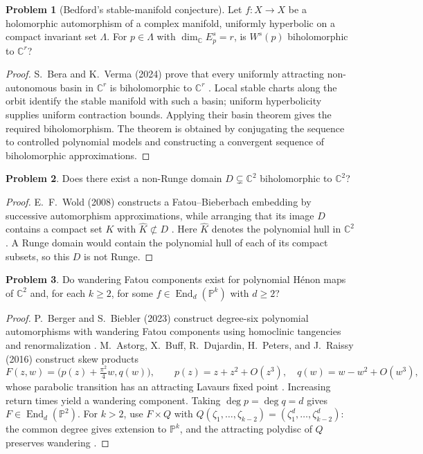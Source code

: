\documentclass[11pt,reqno]{amsart}
\theoremstyle{definition}
\newtheorem{problem}{Problem}[section]
\theoremstyle{remark}
\begin{document}
\begin{problem}[Bedford's stable-manifold conjecture]\label{FS-2.5b}
Let $f:X\to X$ be a holomorphic automorphism of a complex manifold, uniformly hyperbolic on a compact invariant set $\Lambda$. For $p\in\Lambda$ with $\dim_{\mathbb C}E_p^s=r$, is $W^s(p)$ biholomorphic to $\mathbb C^r$?
\end{problem}
\begin{proof}
S.~Bera and K.~Verma (2024) prove that every uniformly attracting non-autonomous basin in $\mathbb C^r$ is biholomorphic to $\mathbb C^r$ \cite{FS-BV}. Local stable charts along the orbit identify the stable manifold with such a basin; uniform hyperbolicity supplies uniform contraction bounds. Applying their basin theorem gives the required biholomorphism. The theorem is obtained by conjugating the sequence to controlled polynomial models and constructing a convergent sequence of biholomorphic approximations.
\end{proof}

\begin{problem}\label{b95-10-1-1}
Does there exist a non-Runge domain $D\subsetneq\mathbb C^2$ biholomorphic to $\mathbb C^2$?
\end{problem}
\begin{proof}
E.~F.~Wold (2008) constructs a Fatou--Bieberbach embedding by successive automorphism approximations, while arranging that its image $D$ contains a compact set $K$ with $\widehat K\not\subset D$ \cite{B95-Wold08}. Here $\widehat K$ denotes the polynomial hull in $\mathbb C^2$. A Runge domain would contain the polynomial hull of each of its compact subsets, so this $D$ is not Runge.
\end{proof}

\begin{problem}\label{b95-10-2-1}\label{b95-10-3-4}\label{FS-2.2}
Do wandering Fatou components exist for polynomial H\'enon maps of $\mathbb C^2$ and, for each $k\geq2$, for some $f\in\operatorname{End}_d(\mathbb P^k)$ with $d\geq2$?
\end{problem}
\begin{proof}
P.~Berger and S.~Biebler (2023) construct degree-six polynomial automorphisms with wandering Fatou components using homoclinic tangencies and renormalization \cite{B95-BB}. M.~Astorg, X.~Buff, R.~Dujardin, H.~Peters, and J.~Raissy (2016) construct skew products
\[
 F(z,w)=\bigl(p(z)+\tfrac{\pi^2}{4}w,q(w)\bigr),\qquad
 p(z)=z+z^2+O(z^3),\quad q(w)=w-w^2+O(w^3),
\]
whose parabolic transition has an attracting Lavaurs fixed point \cite{B95-ABDPR}. Increasing return times yield a wandering component. Taking $\deg p=\deg q=d$ gives $F\in\operatorname{End}_d(\mathbb P^2)$. For $k>2$, use $F\times Q$ with $Q(\zeta_1,\ldots,\zeta_{k-2})=(\zeta_1^d,\ldots,\zeta_{k-2}^d)$: the common degree gives extension to $\mathbb P^k$, and the attracting polydisc of $Q$ preserves wandering \cite[p.~265]{B95-ABDPR}.
\end{proof}
\end{document}
